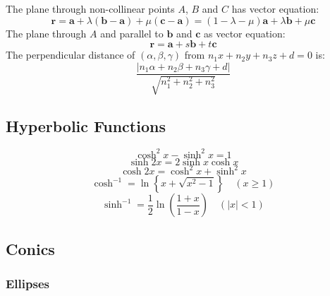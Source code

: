     The plane through non-collinear points $A$, $B$ and $C$ has vector equation:
    \begin{equation}
        \textbf{r}=\textbf{a}+\lambda(\textbf{b}-\textbf{a})+\mu(\textbf{c}-\textbf{a})=(1-\lambda-\mu)\textbf{a}+\lambda\textbf{b}+\mu\textbf{c}
    \end{equation}
    The plane through $A$ and parallel to $\textbf{b}$ and $\textbf{c}$ as vector equation:
    \begin{equation}
        \textbf{r}=\textbf{a}+s\textbf{b}+t\textbf{c}
    \end{equation}
    The perpendicular distance of $(\alpha,\beta,\gamma)$ from $n_1x+n_2y+n_3z+d=0$ is:
    \begin{equation}
        \frac{|n_1\alpha+n_2\beta+n_3\gamma+d|}{\sqrt{n_1^2+n_2^2+n_3^2}}
    \end{equation}

    \subsection{Hyperbolic Functions}
    \begin{equation}
        \cosh^2x-\sinh^2x=1
    \end{equation}
    \begin{equation}
        \sinh2x=2\sinh x\cosh x
    \end{equation}
    \begin{equation}
        \cosh2x=\cosh^2x+\sinh^2x
    \end{equation}
    \begin{equation}
        \cosh^{-1}=\ln\left\{x+\sqrt{x^2-1}\right\}\quad{(x\ge1)}
    \end{equation}
    \begin{equation}
        \sinh^{-1}=\frac{1}{2}\ln\left(\frac{1+x}{1-x}\right)\quad{(|x|<1)}
    \end{equation}

    \subsection{Conics}
    \subsubsection{Ellipses}

